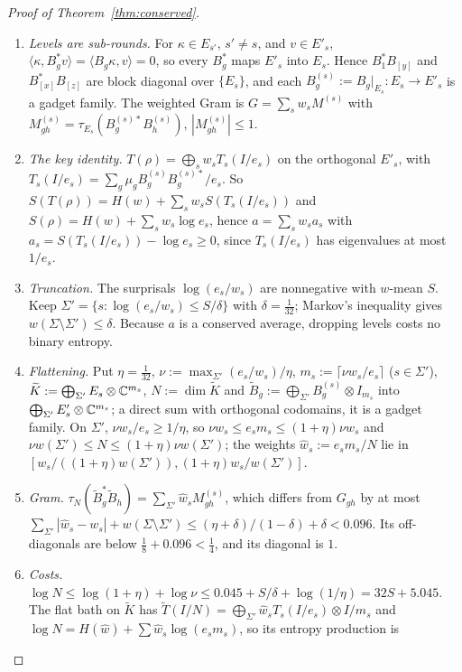 \begin{proof}[Proof of Theorem~\ref{thm:conserved}]
\begin{enumerate}[label=\arabic*.,itemsep=1pt]
\item \emph{Levels are sub-rounds.} For $\kappa\in E_{s'}$, $s'\ne s$, and $v\in E'_s$, $\langle\kappa,B_g^*v\rangle=\langle B_g\kappa,v\rangle=0$, so every $B_g^*$ maps $E'_s$ into $E_s$.
Hence $B_1^*B_{[y]}$ and $B_{[x]}^*B_{[z]}$ are block diagonal over $\{E_s\}$, and each $B^{(s)}_g:=B_g|_{E_s}:E_s\to E'_s$ is a gadget family. The weighted Gram is
$G=\sum_sw_sM^{(s)}$ with $M^{(s)}_{gh}=\tau_{E_s}(B^{(s)*}_gB^{(s)}_h)$, $|M^{(s)}_{gh}|\le1$.
\item \emph{The key identity.} $T(\rho)=\bigoplus_sw_sT_s(I/e_s)$ on the orthogonal $E'_s$, with $T_s(I/e_s)=\sum_g\mu_gB^{(s)}_gB^{(s)*}_g/e_s$. So
$S(T(\rho))=H(w)+\sum_sw_sS(T_s(I/e_s))$ and $S(\rho)=H(w)+\sum_sw_s\log e_s$, hence $a=\sum_sw_sa_s$ with $a_s=S(T_s(I/e_s))-\log e_s\ge0$, since $T_s(I/e_s)$ has
eigenvalues at most $1/e_s$.
\item \emph{Truncation.} The surprisals $\log(e_s/w_s)$ are nonnegative with $w$-mean $S$. Keep $\Sigma'=\{s:\log(e_s/w_s)\le S/\delta\}$ with $\delta=\frac1{32}$; Markov's
inequality gives $w(\Sigma\setminus\Sigma')\le\delta$. Because $a$ is a conserved average, dropping levels costs no binary entropy.
\item \emph{Flattening.} Put $\eta=\frac1{32}$, $\nu:=\max_{\Sigma'}(e_s/w_s)/\eta$, $m_s:=\lceil\nu w_s/e_s\rceil$ ($s\in\Sigma'$), $\widetilde K:=\bigoplus_{\Sigma'}E_s\otimes\mathbb C^{m_s}$,
$N:=\dim\widetilde K$ and $\widetilde B_g:=\bigoplus_{\Sigma'}B^{(s)}_g\otimes I_{m_s}$ into $\bigoplus_{\Sigma'}E'_s\otimes\mathbb C^{m_s}$; a direct sum with orthogonal codomains, it is a gadget
family. On $\Sigma'$, $\nu w_s/e_s\ge1/\eta$, so $\nu w_s\le e_sm_s\le(1+\eta)\nu w_s$ and $\nu w(\Sigma')\le N\le(1+\eta)\nu w(\Sigma')$; the weights $\hat w_s:=e_sm_s/N$ lie in
$[w_s/((1+\eta)w(\Sigma')),(1+\eta)w_s/w(\Sigma')]$.
\item \emph{Gram.} $\tau_N(\widetilde B_g^*\widetilde B_h)=\sum_{\Sigma'}\hat w_sM^{(s)}_{gh}$, which differs from $G_{gh}$ by at most
$\sum_{\Sigma'}|\hat w_s-w_s|+w(\Sigma\setminus\Sigma')\le(\eta+\delta)/(1-\delta)+\delta<0.096$. Its off-diagonals are below $\frac18+0.096<\frac14$, and its diagonal is $1$.
\item \emph{Costs.} $\log N\le\log(1+\eta)+\log\nu\le0.045+S/\delta+\log(1/\eta)=32S+5.045$. The flat bath on $\widetilde K$ has
$\widetilde T(I/N)=\bigoplus_{\Sigma'}\hat w_sT_s(I/e_s)\otimes I/m_s$ and $\log N=H(\hat w)+\sum\hat w_s\log(e_sm_s)$, so its entropy production is

\end{enumerate}
\end{proof}
